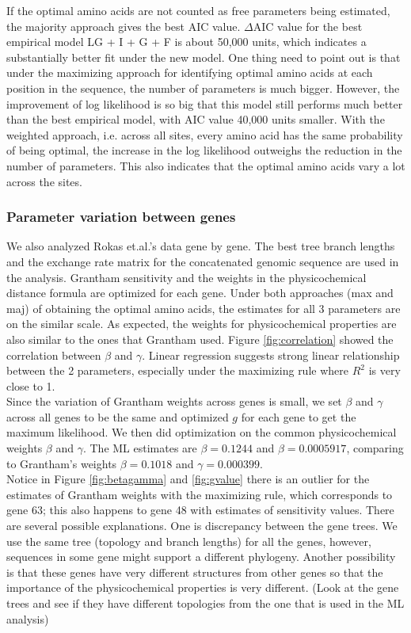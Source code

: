 \documentclass[13pt]{article}
\begin{document}
If the optimal amino acids are not counted as free parameters being estimated, the majority approach gives the best AIC value. $\Delta$AIC value for the best empirical model LG + I + G + F is about 50,000 units, which indicates a substantially better fit under the new model. One thing need to point out is that under the maximizing approach for identifying optimal amino acids at each position in the sequence, the number of parameters is much bigger. However, the improvement of log likelihood is so big that this model still performs much better than the best empirical model, with AIC value 40,000 units smaller. With the weighted approach, i.e. across all sites, every amino acid has the same probability of being optimal, the increase in the log likelihood outweighs the reduction in the number of parameters. This also indicates that the optimal amino acids vary a lot across the sites.  

\subsubsection{Parameter variation between genes}
We also analyzed Rokas et.al.'s data gene by gene. The best tree branch lengths  and the exchange rate matrix for the concatenated genomic sequence are used in the analysis. Grantham sensitivity and the weights in the physicochemical distance formula are optimized for each gene. Under both approaches  (max and maj) of obtaining the optimal amino acids, the estimates for all 3 parameters are on the similar scale. As expected, the weights for physicochemical properties are also similar to the ones that Grantham used. Figure \ref{fig:correlation} showed the correlation between $\beta$ and $\gamma$. Linear regression suggests strong linear relationship between the 2 parameters, especially under the maximizing rule where $R^2$ is very close to 1.\\

Since the variation of Grantham weights across genes is small, we set $\beta$ and $\gamma$ across all genes to be the same and optimized $g$ for each gene to get the maximum likelihood. We then did optimization on the common physicochemical weights $\beta$ and $\gamma$. The ML estimates are $\beta = 0.1244$ and $\beta = 0.0005917$, comparing to Grantham's weights $\beta = 0.1018$ and $\gamma = 0.000399$.\\

Notice in Figure \ref{fig:betagamma} and \ref{fig:gvalue}  there is an outlier for the estimates of Grantham weights with the maximizing rule, which corresponds to gene 63; this also happens to gene 48 with estimates of sensitivity values. There are several possible explanations. One is discrepancy between the gene trees. We use the same tree (topology and branch lengths) for all the genes, however, sequences in some gene might support a different phylogeny. Another possibility is that these genes have very different structures from other genes so that the importance of the physicochemical properties is very different. (Look at the gene trees and see if they have different topologies from the one that is used in the ML analysis)\\
\end{document}
